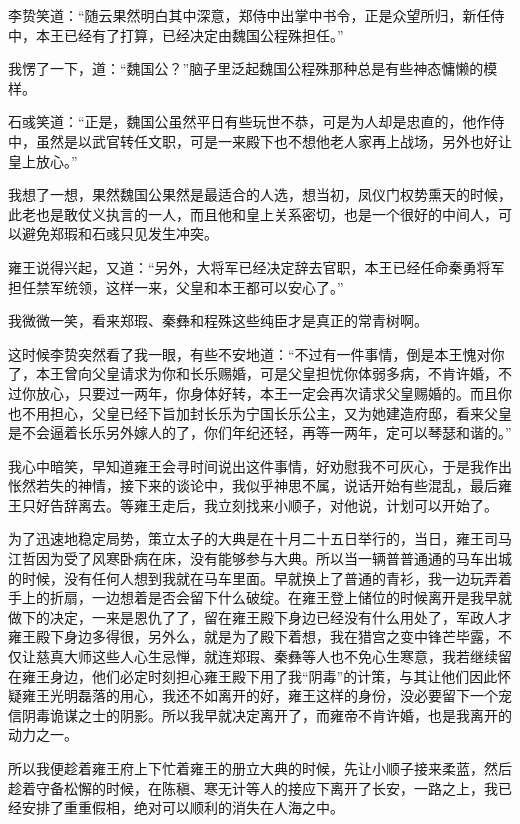 李贽笑道：“随云果然明白其中深意，郑侍中出掌中书令，正是众望所归，新任侍中，本王已经有了打算，已经决定由魏国公程殊担任。”

我愣了一下，道：“魏国公？”脑子里泛起魏国公程殊那种总是有些神态慵懒的模样。

石彧笑道：“正是，魏国公虽然平日有些玩世不恭，可是为人却是忠直的，他作侍中，虽然是以武官转任文职，可是一来殿下也不想他老人家再上战场，另外也好让皇上放心。”

我想了一想，果然魏国公果然是最适合的人选，想当初，凤仪门权势熏天的时候，此老也是敢仗义执言的一人，而且他和皇上关系密切，也是一个很好的中间人，可以避免郑瑕和石彧只见发生冲突。

雍王说得兴起，又道：“另外，大将军已经决定辞去官职，本王已经任命秦勇将军担任禁军统领，这样一来，父皇和本王都可以安心了。”

我微微一笑，看来郑瑕、秦彝和程殊这些纯臣才是真正的常青树啊。

这时候李贽突然看了我一眼，有些不安地道：“不过有一件事情，倒是本王愧对你了，本王曾向父皇请求为你和长乐赐婚，可是父皇担忧你体弱多病，不肯许婚，不过你放心，只要过一两年，你身体好转，本王一定会再次请求父皇赐婚的。而且你也不用担心，父皇已经下旨加封长乐为宁国长乐公主，又为她建造府邸，看来父皇是不会逼着长乐另外嫁人的了，你们年纪还轻，再等一两年，定可以琴瑟和谐的。”

我心中暗笑，早知道雍王会寻时间说出这件事情，好劝慰我不可灰心，于是我作出怅然若失的神情，接下来的谈论中，我似乎神思不属，说话开始有些混乱，最后雍王只好告辞离去。等雍王走后，我立刻找来小顺子，对他说，计划可以开始了。

为了迅速地稳定局势，策立太子的大典是在十月二十五日举行的，当日，雍王司马江哲因为受了风寒卧病在床，没有能够参与大典。所以当一辆普普通通的马车出城的时候，没有任何人想到我就在马车里面。早就换上了普通的青衫，我一边玩弄着手上的折扇，一边想着是否会留下什么破绽。在雍王登上储位的时候离开是我早就做下的决定，一来是恩仇了了，留在雍王殿下身边已经没有什么用处了，军政人才雍王殿下身边多得很，另外么，就是为了殿下着想，我在猎宫之变中锋芒毕露，不仅让慈真大师这些人心生忌惮，就连郑瑕、秦彝等人也不免心生寒意，我若继续留在雍王身边，他们必定时刻担心雍王殿下用了我“阴毒”的计策，与其让他们因此怀疑雍王光明磊落的用心，我还不如离开的好，雍王这样的身份，没必要留下一个宠信阴毒诡谋之士的阴影。所以我早就决定离开了，而雍帝不肯许婚，也是我离开的动力之一。

所以我便趁着雍王府上下忙着雍王的册立大典的时候，先让小顺子接来柔蓝，然后趁着守备松懈的时候，在陈稹、寒无计等人的接应下离开了长安，一路之上，我已经安排了重重假相，绝对可以顺利的消失在人海之中。

